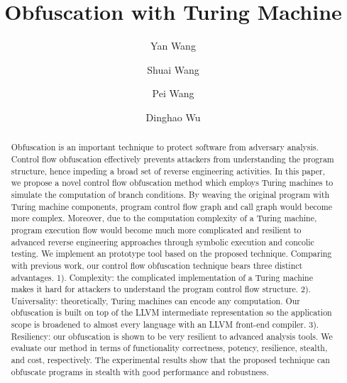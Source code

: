 \documentclass[lnicst]{svmultln}
\begin{document}
%
\mainmatter              %
%
\title{Obfuscation with Turing Machine}
%
%
\author{Yan Wang \and Shuai Wang \and Pei Wang \and Dinghao Wu}
%
%
%
\institute{The Pennsylvania State University\\University Park, PA 16802, USA\\
\email{{ybw5084,szw175,pxw172,dwu}@ist.psu.edu} %
}
\maketitle              

\begin{abstract} %
Obfuscation is an important technique to protect software from adversary
analysis. Control flow obfuscation effectively prevents attackers from
understanding the program structure, hence impeding a broad set of reverse
engineering activities. In this paper, we propose a novel control flow
obfuscation method which employs Turing machines to simulate the computation of
branch conditions. By weaving the original program with Turing machine
components, program control flow graph and call graph would become more complex.
Moreover, due to the computation complexity of a Turing machine, program
execution flow would become much more complicated and resilient to advanced
reverse engineering approaches through symbolic execution and concolic testing.
%
We implement an prototype tool based on the proposed technique. Comparing with
previous work, our control flow obfuscation technique bears three distinct
advantages. 1). Complexity: the complicated implementation of a Turing machine
makes it hard for attackers to understand the program control flow structure.
2). Universality: theoretically, Turing machines can encode any computation. Our
obfuscation is built on top of the LLVM intermediate representation so the
application scope is broadened to almost every language with an LLVM front-end
compiler. 3). Resiliency: our obfuscation is shown to be very resilient to
advanced analysis tools. We evaluate our method in terms of functionality
correctness, potency, resilience, stealth, and cost, respectively. The
experimental results show that the proposed technique can obfuscate programs in
stealth with good performance and robustness.
\end{abstract}
\end{document}
